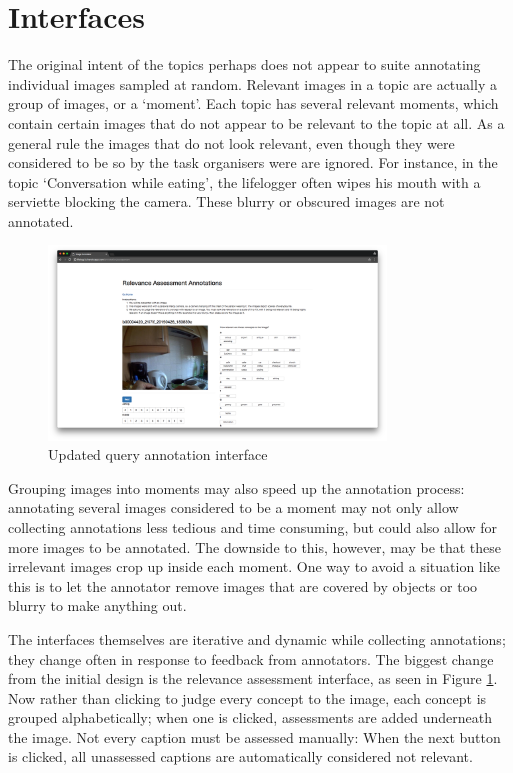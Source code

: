 \section{Interfaces}

The original intent of the topics perhaps does not appear to suite annotating individual images sampled at random. Relevant images in a topic are actually a group of images, or a `moment'. Each topic has several relevant moments, which contain certain images that do not appear to be relevant to the topic at all. As a general rule the images that do not look relevant, even though they were considered to be so by the task organisers were are ignored. For instance, in the topic `Conversation while eating', the lifelogger often wipes his mouth with a serviette blocking the camera. These blurry or obscured images are not annotated. 

\begin{figure}[b]
    \centering
    \includegraphics[width=0.8\textwidth]{images/new-rel-ass-interface}
    \caption{Updated query annotation interface}
    \label{fig:new-rel-ass}
\end{figure}

\FloatBarrier
Grouping images into moments may also speed up the annotation process: annotating several images considered to be a moment may not only allow collecting annotations less tedious and time consuming, but could also allow for more images to be annotated. The downside to this, however, may be that these irrelevant images crop up inside each moment. One way to avoid a situation like this is to let the annotator remove images that are covered by objects or too blurry to make anything out.

The interfaces themselves are iterative and dynamic while collecting annotations; they change often in response to feedback from annotators. The biggest change from the initial design is the relevance assessment interface, as seen in Figure \ref{fig:new-rel-ass}. Now rather than clicking to judge every concept to the image, each concept is grouped alphabetically; when one is clicked, assessments are added underneath the image. Not every caption must be assessed manually: When the next button is clicked, all unassessed captions are automatically considered not relevant. 




